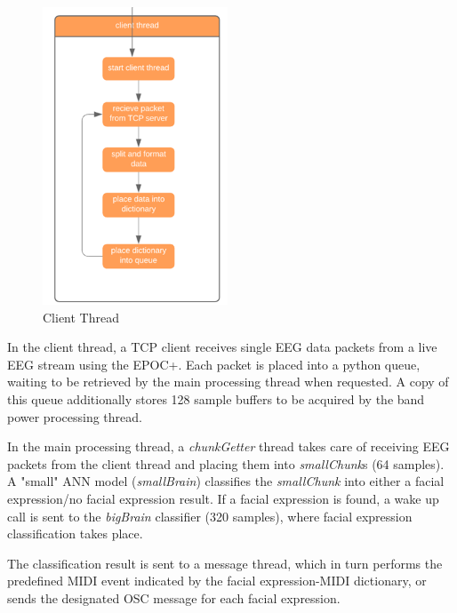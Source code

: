  \begin{figure}[htbp!]
	\centering
		\includegraphics[width=0.25\columnwidth]{clientThread.png}
	\caption{Client Thread}
	\label{fig:clientThread}
\end{figure} 


In the client thread, a TCP client receives single EEG data packets from a live EEG stream using the EPOC+. Each packet is placed into a python queue, waiting to be retrieved by the main processing thread when requested. A copy of this queue additionally stores 128 sample buffers to be acquired by the band power processing thread. 


In the main processing thread, a  \textit{chunkGetter} thread takes care of receiving EEG packets from the client thread and placing them into \textit{smallChunk}s (64 samples). A "small" ANN model (\textit{smallBrain}) classifies the \textit{smallChunk} into either a facial expression/no facial expression result. If a facial expression is found, a wake up call is sent to the \textit{bigBrain} classifier (320 samples), where facial expression classification takes place. 

The classification result is sent to a message thread, which in turn performs the predefined MIDI event indicated by the facial expression-MIDI dictionary, or sends the designated OSC message for each facial expression.

